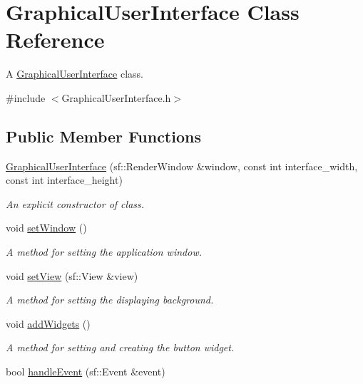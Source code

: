 \hypertarget{classGraphicalUserInterface}{}\section{Graphical\+User\+Interface Class Reference}
\label{classGraphicalUserInterface}


A \hyperlink{classGraphicalUserInterface}{Graphical\+User\+Interface} class.  




{\ttfamily \#include $<$Graphical\+User\+Interface.\+h$>$}

\subsection*{Public Member Functions}
\begin{DoxyCompactItemize}
\item 
\hyperlink{classGraphicalUserInterface_a53c95b6d9e7a7b1f04b60d925a8e2e7b}{Graphical\+User\+Interface} (sf\+::\+Render\+Window \&window, const int interface\+\_\+width, const int interface\+\_\+height)
\begin{DoxyCompactList}\small\item\em An explicit constructor of class. \end{DoxyCompactList}\item 
void \hyperlink{classGraphicalUserInterface_a9dc5f335b77be5a4d871926155afb8dd}{set\+Window} ()
\begin{DoxyCompactList}\small\item\em A method for setting the application window. \end{DoxyCompactList}\item 
void \hyperlink{classGraphicalUserInterface_ab0c8cd6460442a3ad01c304ec1216631}{set\+View} (sf\+::\+View \&view)
\begin{DoxyCompactList}\small\item\em A method for setting the displaying background. \end{DoxyCompactList}\item 
void \hyperlink{classGraphicalUserInterface_a48e6dcc9acc179fdb74e67a51d66efb7}{add\+Widgets} ()
\begin{DoxyCompactList}\small\item\em A method for setting and creating the button widget. \end{DoxyCompactList}\item 
bool \hyperlink{classGraphicalUserInterface_a71964c3c49b23a05aa3fd4b4d36aa42d}{handle\+Event} (sf\+::\+Event \&event)

\end{DoxyCompactItemize}
